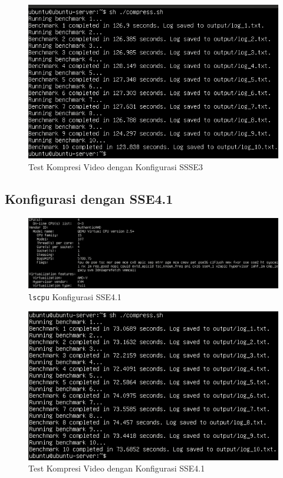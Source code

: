 \begin{figure}
    \centering
    \includegraphics[width=1\textwidth]
    {assets/pics/video-compression-test/ssse3.jpeg}
    \caption{Test Kompresi Video dengan Konfigurasi SSSE3}
    \label{fig:video_compression_test_ssse3}
\end{figure}

\subsection{Konfigurasi dengan SSE4.1}
\begin{figure}
    \centering
    \includegraphics[width=1\textwidth]
    {assets/pics/video-compression-test/lscpu_sse4.1.jpeg}
    \caption{\texttt{lscpu} Konfigurasi SSE4.1}
    \label{fig:lscpu_video_compression_test_sse4.1}
\end{figure}

\begin{figure}
    \centering
    \includegraphics[width=1\textwidth]
    {assets/pics/video-compression-test/sse4.1.jpeg}
    \caption{Test Kompresi Video dengan Konfigurasi SSE4.1}
    \label{fig:video_compression_test_sse4.1}
\end{figure}

